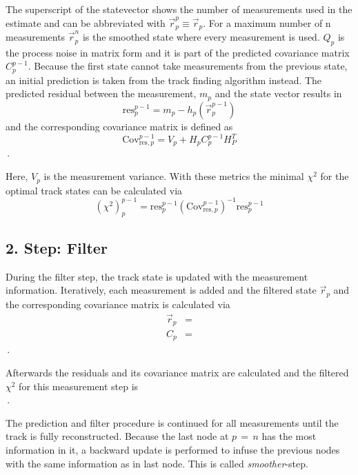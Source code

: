 The superscript of the statevector shows the number of measurements used in the estimate and can be abbreviated with $\vec{r}_p^p \equiv \vec{r}_p$. For a maximum number of n measurements $\vec{r}_p^n$ is the smoothed state where every measurement is used.
$Q_p$ is the process noise in matrix form and it is part of the predicted covariance matrix $C_p^{p-1}$.
Because the first state cannot take measurements from the previous state, an initial prediction is taken from the track finding algorithm instead.
The predicted residual between the measurement, $m_p$ and the state vector results in
\begin{equation}
  \text{res}_p^{p-1} = m_p - h_p\left( \vec{r}_p^{p-1} \right)
\end{equation}
and the corresponding covariance matrix is defined as
\begin{equation}
  \text{Cov}_{\text{res},p}^{p-1} = V_p + H_p C_p^{p-1} H_P^T
\end{equation}\,.

Here, $V_p$ is the measurement variance. With these metrics the minimal $\chi^2$ for the optimal track states can be calculated via
\begin{equation}
  \left( \chi^2 \right)_p^{p-1} = \text{res}_p^{p-1} \left(\text{Cov}_{\text{res},p}^{p-1}\right)^{-1} \text{res}_p^{p-1}
\end{equation}

\subsection{2. Step: Filter}
During the filter step, the track state is updated with the measurement information.
Iteratively, each measurement is added and the filtered state $\vec{r}_p$ and the corresponding covariance matrix is calculated via
\begin{align}
  \vec{r}_p &= \\
  C_p &=
\end{align}\,.

Afterwards the residuals and its covariance matrix are calculated and the filtered $\chi^2$ for this measurement step is
\begin{equation}

\end{equation}\,.

The prediction and filter procedure is continued for all measurements until the track is fully reconstructed.
Because the last node at $p \, = \, n$ has the most information in it, a backward update is performed to infuse the previous nodes with the same information as in last node.
This is called \textit{smoother}-step.

